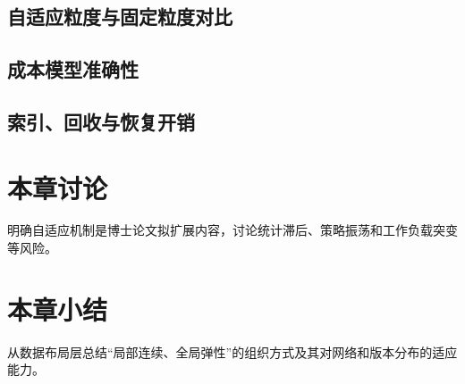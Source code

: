 \subsection{自适应粒度与固定粒度对比}
\subsection{成本模型准确性}
\subsection{索引、回收与恢复开销}

\section{本章讨论}
明确自适应机制是博士论文拟扩展内容，讨论统计滞后、策略振荡和工作负载突变等风险。
\section{本章小结}
从数据布局层总结“局部连续、全局弹性”的组织方式及其对网络和版本分布的适应能力。
